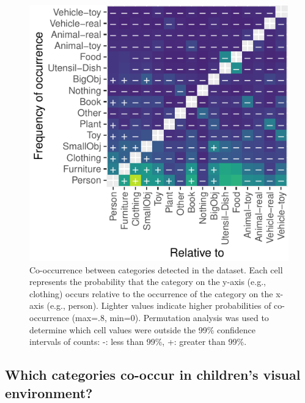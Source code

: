 \documentclass[10pt, letterpaper]{article}
\newenvironment{CodeChunk}{}{}
\begin{document}
\begin{CodeChunk}
\begin{figure}[h]

{\centering \includegraphics{figs/coocc_stats-1} 

}

\caption[Co-occurrence between categories detected in the dataset]{Co-occurrence between categories detected in the dataset. Each cell represents the probability that the category on the y-axis (e.g., clothing) occurs relative to the occurrence of the category on the x-axis (e.g., person). Lighter values indicate higher probabilities of co-occurrence (max=.8, min=0). Permutation analysis was used to determine which cell values were outside the 99\% confidence intervals of counts: -: less than 99\%, +: greater than 99\%.}\label{fig:coocc_stats}
\end{figure}
\end{CodeChunk}

\hypertarget{which-categories-co-occur-in-childrens-visual-environment}{%
\subsection{Which categories co-occur in children's visual
environment?}\label{which-categories-co-occur-in-childrens-visual-environment}}
\end{document}
